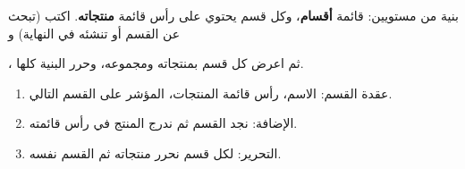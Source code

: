 \begin{statement}
بنية من مستويين: قائمة \textbf{أقسام}، وكل قسم يحتوي على رأس قائمة \textbf{منتجاته}. اكتب  (تبحث عن القسم أو تنشئه في النهاية) و \par{\centering\small{}\par}، ثم اعرض كل قسم بمنتجاته ومجموعه، وحرر البنية كلها.
\end{statement}
\begin{stepsbox}\begin{enumerate}
\item عقدة القسم: الاسم، رأس قائمة المنتجات، المؤشر على القسم التالي.
\item الإضافة: نجد القسم ثم ندرج المنتج في رأس قائمته.
\item التحرير: لكل قسم نحرر منتجاته ثم القسم نفسه.
\end{enumerate}\end{stepsbox}
